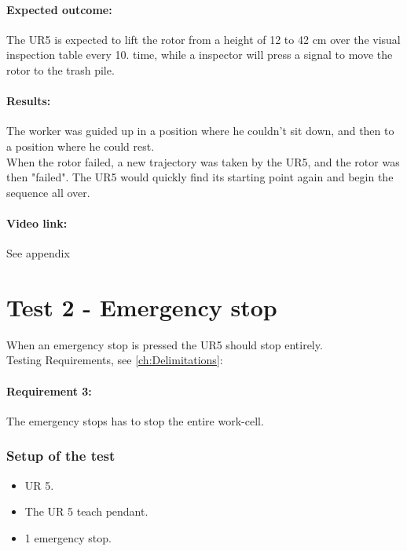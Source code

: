 \paragraph{Expected outcome:} 
The UR5 is expected to lift the rotor from a height of 12 to 42 cm over the visual inspection table every 10. time, while a inspector will press a signal to move the rotor to the trash pile. 

\paragraph{Results: }

The worker was guided up in a position where he couldn't sit down, and then to a position where he could rest.\\
When the rotor failed, a new trajectory was taken by the UR5, and the rotor was then "failed". The UR5 would quickly find its starting point again and begin the sequence all over.\\

\paragraph{Video link: }
See appendix \cite{testfilm}

\section{Test 2 - Emergency stop}

When an emergency stop is pressed the UR5 should stop entirely.\\
Testing Requirements, see  \ref{ch:Delimitations}:\\

\paragraph{Requirement 3:} The emergency stops has to stop the entire work-cell.\\

\subsubsection{Setup of the test}

\begin{itemize}
    \item UR 5.
    \item The UR 5 teach pendant.
    \item 1 emergency stop.
\end{itemize}

